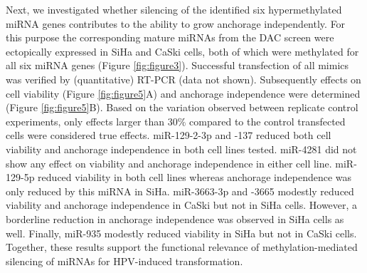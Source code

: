 Next, we investigated whether silencing of the identified six hypermethylated miRNA genes contributes to the ability to grow anchorage independently. For this purpose the corresponding mature miRNAs from the DAC screen were ectopically expressed in SiHa and CaSki cells, both of which were methylated for all six miRNA genes (Figure \ref{fig:figure3}). Successful transfection of all mimics was verified by (quantitative) RT-PCR (data not shown). Subsequently effects on cell viability (Figure \ref{fig:figure5}A) and anchorage independence were determined (Figure \ref{fig:figure5}B). Based on the variation observed between replicate control experiments, only effects larger than 30$\%$ compared to the control transfected cells were considered true effects. miR-129-2-3p and -137 reduced both cell viability and anchorage independence in both cell lines tested. miR-4281 did not show any effect on viability and anchorage independence in either cell line. miR-129-5p reduced viability in both cell lines whereas anchorage independence was only reduced by this miRNA in SiHa. miR-3663-3p and -3665 modestly reduced viability and anchorage independence in CaSki but not in SiHa cells. However, a borderline reduction in anchorage independence was observed in SiHa cells as well. Finally, miR-935 modestly reduced viability in SiHa but not in CaSki cells. Together, these results support the functional relevance of methylation-mediated silencing of miRNAs for HPV-induced transformation.

